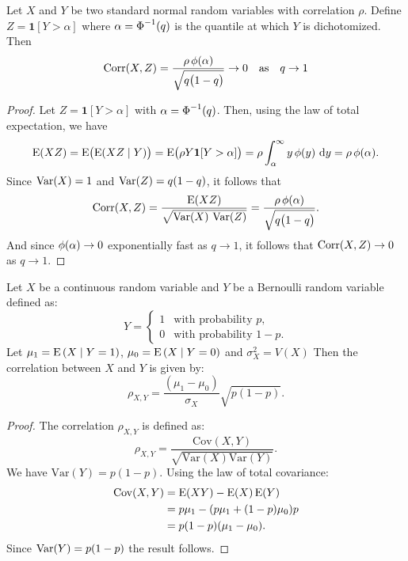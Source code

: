 \begin{theorem}
  Let \(X\) and \(Y\) be two standard normal random variables with correlation \(\rho\).
  Define \(Z = \bm{1}[Y > \alpha]\) where \(\alpha = \operatorname{\Phi}^{-1}(q)\) is the
  quantile at which \(Y\) is dichotomized.
  Then
  \[
    \operatorname{Corr}(X,Z)
    = \frac{\rho\operatorname{\phi}(\alpha)}{\sqrt{q \bigl(1 - q\bigr)}} \rightarrow 0 \quad\text{as}\quad q \rightarrow 1
  \]
\end{theorem}
\begin{proof}
  Let \(Z = \mathbf{1}[Y > \alpha]\) with \(\alpha = \operatorname{\Phi}^{-1}(q)\). Then,
  using the law of total expectation, we have
  \[
    \operatorname{E}(XZ) = \operatorname{E}\bigl(\operatorname{E}(XZ \mid Y)\bigr) = \operatorname{E}\bigl(\rho Y \bm{1}[Y > \alpha]\bigr)
    = \rho \int_{\alpha}^{\infty} y \operatorname{\phi}(y)\,\mathop{}\!\mathrm{d} y = \rho \operatorname{\phi}(\alpha).
  \]
  Since \(\operatorname{Var}(X) = 1\) and \(\operatorname{Var}(Z) = q (1 - q)\), it follows that
  \[
    \operatorname{Corr}(X,Z) = \frac{\operatorname{E}(XZ)}{\sqrt{\operatorname{Var}(X)\,\operatorname{Var}(Z)}} = \frac{\rho \operatorname{\phi}(\alpha)}{\sqrt{q \bigl(1 - q\bigr)}}.
  \]
  And since \(\operatorname{\phi}(\alpha) \to 0\) exponentially fast as \(q \to 1\), it follows that
  \(\operatorname{Corr}(X,Z) \to 0\) as \(q \to 1\).
\end{proof}

\begin{theorem}
  Let \(X\) be a continuous random variable and \(Y\) be a Bernoulli random variable defined as:
  \[
  Y = \begin{cases}
  1 & \text{with probability } p, \\
  0 & \text{with probability } 1-p.
  \end{cases}
  \]
  Let \(\mu_1 = \operatorname{E} \left( X \mid Y=1 \right)\), \(\mu_0 =  \operatorname{E} \left( X \mid Y=0 \right)\) and $\sigma_X^2 = V \left(X \right)$
  Then the correlation between \(X\) and \(Y\) is given by:
  \[
  \rho_{X,Y} = \frac{(\mu_1 - \mu_0)}{\sigma_X}\sqrt{p(1-p)}.
  \]
  \end{theorem}
  
  \begin{proof}
  The correlation \(\rho_{X,Y}\) is defined as:
  \[
  \rho_{X,Y} = \frac{\mathrm{Cov}(X,Y)}{\sqrt{\mathrm{Var}(X)\mathrm{Var}(Y)}}.
  \]
  We have \(\mathrm{Var}(Y)=p(1-p)\). Using the law of total covariance:
  \begin{align*}
  \mathrm{Cov}(X,Y) &= \operatorname{E} (XY) - \operatorname{E}(X) \operatorname{E}(Y) \\
  &= p\mu_1 - (p\mu_1 + (1-p)\mu_0)p \\
  &= p(1-p)(\mu_1 - \mu_0).
  \end{align*}
  Since $\mathrm{Var} (Y)=p(1-p)$ the result follows.
  \end{proof}
  
